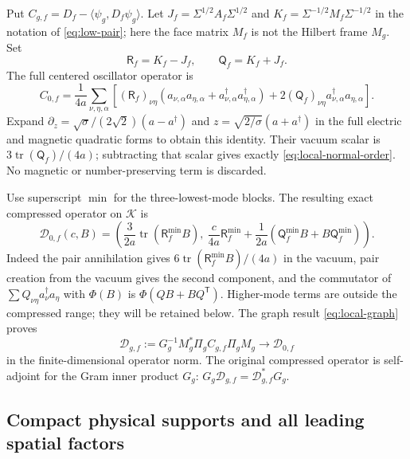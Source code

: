 Put $C_{g,f}=D_f-\langle\psi_g,D_f\psi_g\rangle$.
Let $J_f=\Sigma^{1/2}A_f\Sigma^{1/2}$ and
$K_f=\Sigma^{-1/2}M_f\Sigma^{-1/2}$ in the notation of
\eqref{eq:low-pair}; here the face matrix $M_f$ is not the Hilbert
frame $M_g$. Set
\[
 \mathsf R_f=K_f-J_f,\qquad \mathsf Q_f=K_f+J_f.
\]
The full centered oscillator operator is
\begin{equation}\label{eq:local-normal-order}
 C_{0,f}=\frac1{4a}\sum_{\nu,\eta,\alpha}
 \left[(\mathsf R_f)_{\nu\eta}
 (a_{\nu,\alpha}a_{\eta,\alpha}
       +a_{\nu,\alpha}^\dagger a_{\eta,\alpha}^\dagger)
       +2(\mathsf Q_f)_{\nu\eta}
                      a_{\nu,\alpha}^\dagger a_{\eta,\alpha}\right].
\end{equation}
Expand $\partial_z=\sqrt{\sigma}/(2\sqrt2)(a-a^\dagger)$
and $z=\sqrt{2/\sigma}(a+a^\dagger)$ in the full electric and
magnetic quadratic forms to obtain this identity.
Their vacuum scalar is $3\operatorname{tr}(\mathsf Q_f)/(4a)$;
subtracting that scalar gives exactly
\eqref{eq:local-normal-order}. No magnetic or number-preserving term
is discarded.

Use superscript $\min$ for the three-lowest-mode blocks. The resulting
exact compressed operator on $\mathcal K$ is
\begin{equation}\label{eq:local-compression}
 \mathcal D_{0,f}(c,B)=
 \left(\frac{3}{2a}\operatorname{tr}(\mathsf R_f^{\min}B),
 \ \frac{c}{4a}\mathsf R_f^{\min}
       +\frac1{2a}(\mathsf Q_f^{\min}B+B\mathsf Q_f^{\min})\right).
\end{equation}
Indeed the pair annihilation gives
$6\operatorname{tr}(\mathsf R_f^{\min}B)/(4a)$ in the vacuum,
pair creation from the vacuum gives the second component, and the
commutator of
$\sum Q_{\nu\eta}a_\nu^\dagger a_\eta$ with $\Phi(B)$ is
$\Phi(QB+BQ^{\mathsf T})$. Higher-mode terms are outside the
compressed range; they will be retained below.
The graph result \eqref{eq:local-graph} proves
\begin{equation}\label{eq:local-compression-actual}
 \mathcal D_{g,f}:=
 G_g^{-1}M_g^*\Pi_gC_{g,f}\Pi_gM_g
 \longrightarrow\mathcal D_{0,f}
\end{equation}
in the finite-dimensional operator norm. The original compressed
operator is self-adjoint for the Gram inner product $G_g$:
$G_g\mathcal D_{g,f}=\mathcal D_{g,f}^*G_g$.

\subsection{Compact physical supports and all leading spatial factors}

